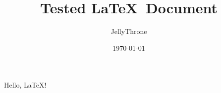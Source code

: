 \documentclass{beamer}
\title{Tested \LaTeX\ Document}
\author{JellyThrone}
\date{\today}
\begin{document}
    Hello, \LaTeX !
\end{document}
